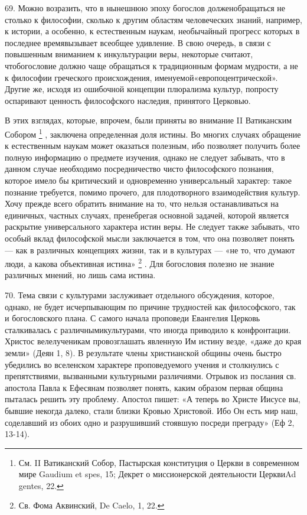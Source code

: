 \documentclass[a5paper,10pt]{article}
\begin{document}
69. Можно возразить, что в нынешнюю эпоху богослов долженобращаться не столько
к философии, сколько к другим областям человеческих знаний, например, к
истории, а особенно, к естественным наукам, необычайный прогресс которых в
последнее времявызывает всеобщее удивление. В свою очередь, в связи с
повышенным вниманием к инкультурации веры, некоторые считают, чтобогословие
должно чаще обращаться к традиционным формам мудрости, а не к философии
греческого происхождения, именуемой«европоцентрической». Другие же, исходя из
ошибочной концепции плюрализма культур, попросту оспаривают ценность
философского наследия, принятого Церковью.

В этих взглядах, которые, впрочем, были приняты во внимание II Ватиканским
Собором \footnote{См. II Ватиканский Собор, Пастырская конституция о Церкви в
современном мире Gaudium et spes, 15; Декрет о миссионерской деятельности
ЦерквиAd gentes, 22.} , заключена определенная доля истины. Во многих случаях
обращение к естественным наукам может оказаться полезным, ибо позволяет
получить более полную информацию о предмете изучения, однако не следует
забывать, что в данном случае необходимо посредничество чисто философского
познания, которое имело бы критический и одновременно универсальный характер:
такое познание требуется, помимо прочего, для плодотворного взаимодействия
культур. Хочу прежде всего обратить внимание на то, что нельзя останавливаться
на единичных, частных случаях, пренебрегая основной задачей, которой является
раскрытие универсального характера истин веры. Не следует также забывать, что
особый вклад философской мысли заключается в том, что она позволяет понять —
как в различных концепциях жизни, так и в культурах — «не то, что думают люди,
а какова объективная истина» \footnote{Св. Фома Аквинский, De Caelo, 1, 22.} .
Для богословия полезно не знание различных мнений, но лишь сама истина.

70. Тема связи с культурами заслуживает отдельного обсуждения, которое, однако,
не будет исчерпывающим по причине трудностей как философского, так и
богословского плана. С самого начала проповеди Евангелия Церковь сталкивалась с
различнымикультурами, что иногда приводило к конфронтации. Христос
велелученикам провозглашать явленную Им истину везде, «даже до края земли»
(Деян 1, 8). В результате члены христианской общины очень быстро убедились во
вселенском характере проповедуемого учения и столкнулись с препятствиями,
вызванными культурными различиями. Отрывок из послания св.  апостола Павла к
Ефесянам позволяет понять, каким образом первая община пыталась решить эту
проблему. Апостол пишет: «А теперь во Христе Иисусе вы, бывшие некогда далеко,
стали близки Кровью Христовой. Ибо Он есть мир наш, соделавший из обоих одно и
разрушивший стоявшую посреди преграду» (Еф 2, 13-14).
\end{document}
